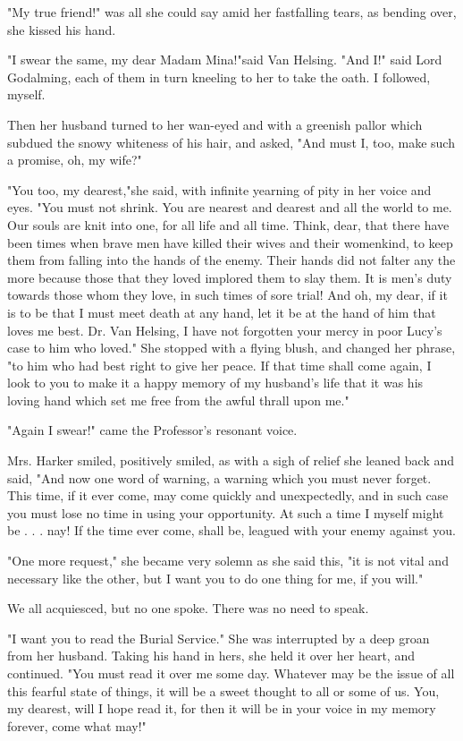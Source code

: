 "My true friend!" was all she could say amid her fastfalling tears, as bending over, she kissed his hand. 

"I swear the same, my dear Madam Mina!"said Van Helsing. "And I!" said Lord Godalming, each of them in turn kneeling to her to take the oath. I followed, myself. 

Then her husband turned to her wan-eyed and with a greenish pallor which subdued the snowy whiteness of his hair, and asked, "And must I, too, make such a promise, oh, my wife?" 

"You too, my dearest,"she said, with infinite yearning of pity in her voice and eyes. "You must not shrink. You are nearest and dearest and all the world to me. Our souls are knit into one, for all life and all time. Think, dear, that there have been times when brave men have killed their wives and their womenkind, to keep them from falling into the hands of the enemy. Their hands did not falter any the more because those that they loved implored them to slay them. It is men's duty towards those whom they love, in such times of sore trial! And oh, my dear, if it is to be that I must meet death at any hand, let it be at the hand of him that loves me best. Dr. Van Helsing, I have not forgotten your mercy in poor Lucy's case to him who loved." She stopped with a flying blush, and changed her phrase, "to him who had best right to give her peace. If that time shall come again, I look to you to make it a happy memory of my husband's life that it was his loving hand which set me free from the awful thrall upon me." 

"Again I swear!" came the Professor's resonant voice. 

Mrs. Harker smiled, positively smiled, as with a sigh of relief she leaned back and said, "And now one word of warning, a warning which you must never forget. This time, if it ever come, may come quickly and unexpectedly, and in such case you must lose no time in using your opportunity. At such a time I myself might be . . . nay! If the time ever come, shall be, leagued with your enemy against you. 

"One more request," she became very solemn as she said this, "it is not vital and necessary like the other, but I want you to do one thing for me, if you will." 

We all acquiesced, but no one spoke. There was no need to speak. 

"I want you to read the Burial Service." She was interrupted by a deep groan from her husband. Taking his hand in hers, she held it over her heart, and continued. "You must read it over me some day. Whatever may be the issue of all this fearful state of things, it will be a sweet thought to all or some of us. You, my dearest, will I hope read it, for then it will be in your voice in my memory forever, come what may!" 

